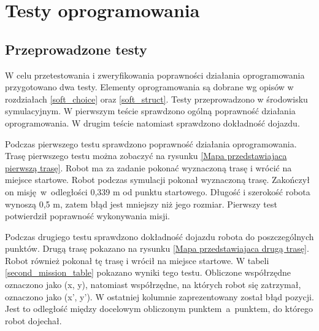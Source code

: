 \newpage
\section{Testy oprogramowania}\label{tests}
{
    \subsection{Przeprowadzone testy}\label{pre_tests}
    {
        W celu przetestowania i zweryfikowania poprawności działania oprogramowania przygotowano dwa testy. Elementy oprogramowania są dobrane wg opisów w rozdziałach \ref{soft_choice} oraz \ref{soft_struct}. Testy przeprowadzono w środowisku symulacyjnym. W pierwszym teście sprawdzono ogólną poprawność działania oprogramowania. W drugim teście natomiast sprawdzono dokładność dojazdu.

        
        Podczas pierwszego testu sprawdzono poprawność działania oprogramowania. Trasę pierwszego testu można zobaczyć na rysunku \ref{Mapa przedstawiajaca pierwszą trasę}. Robot ma za zadanie pokonać wyznaczoną trasę i wrócić na miejsce startowe. Robot podczas symulacji pokonał wyznaczoną trasę. Zakończył on misję~w~odległości 0,339 m od punktu startowego. 
        Długość i szerokość robota wynoszą 0,5 m, zatem błąd jest mniejszy niż jego rozmiar.
        Pierwszy test potwierdził poprawność wykonywania misji.
        
        Podczas drugiego testu sprawdzono dokładność dojazdu robota do poszczególnych punktów. Drugą trasę pokazano na rysunku \ref{Mapa przedstawiajaca drugą trasę}. Robot również pokonał tę trasę i wrócił na miejsce startowe. W tabeli \ref{second_mission_table} pokazano wyniki tego testu. Obliczone współrzędne oznaczono jako (x, y), natomiast współrzędne, na których robot się zatrzymał, oznaczono jako (x', y'). W ostatniej kolumnie zaprezentowany został błąd pozycji. Jest to odległość między docelowym obliczonym punktem~a~punktem, do którego robot dojechał.



}}
